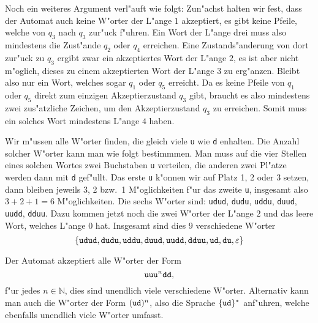 \begin{loesung}
\begin{teilaufgaben}
Noch ein weiteres Argument verl"auft wie folgt:
Zun"achst halten wir fest, dass der Automat auch keine W"orter der
L"ange $1$ akzeptiert, es gibt keine Pfeile, welche von $q_3$ nach
$q_3$ zur"uck f"uhren. Ein Wort der L"ange drei muss also mindestens
die Zust"ande $q_2$ oder $q_4$ erreichen. Eine Zustands"anderung von
dort zur"uck zu $q_3$ ergibt zwar ein akzeptiertes Wort der L"ange
$2$, es ist aber nicht m"oglich, dieses zu einem akzeptierten Wort
der L"ange $3$ zu erg"anzen.
Bleibt also nur ein Wort, welches
sogar $q_1$ oder $q_5$ erreicht. Da es keine Pfeile von $q_1$
oder $q_5$ direkt zum einzigen Akzeptierzustand $q_3$ gibt,
braucht es also mindestens zwei zus"atzliche Zeichen, um den
Akzeptierzustand $q_3$ zu erreichen. Somit muss ein solches
Wort mindestens L"ange $4$ haben.
\item Wir m"ussen alle W"orter finden, die gleich viele {\tt u} wie {\tt d}
enhalten. Die Anzahl solcher W"orter kann man wie folgt bestimmmen.
Man muss auf die vier Stellen eines solchen Wortes zwei Buchstaben
{\tt u} verteilen, die anderen zwei Pl"atze werden dann mit {\tt d}
gef"ullt. Das erste {\tt u} k"onnen wir auf Platz 1, 2 oder 3 setzen,
dann bleiben jeweils 3, 2 bzw.~1 M"oglichkeiten f"ur das zweite {\tt u},
insgesamt also $3+2+1=6$ M"oglichkeiten. Die sechs W"orter sind:
{\tt udud}, {\tt dudu}, {\tt uddu}, {\tt duud}, {\tt uudd}, {\tt dduu}.
Dazu kommen jetzt noch die zwei W"orter der L"ange $2$ und das leere Wort,
welches L"ange $0$ hat. Insgesamt sind dies $9$ verschiedene W"orter
\[
\{
{\tt udud}, {\tt dudu}, {\tt uddu}, {\tt duud}, {\tt uudd}, {\tt dduu},
{\tt ud},{\tt du}, \varepsilon
\}
\]
\item Der Automat akzeptiert alle W"orter der Form
\[
\text{\tt uu}
\text{\tt u}^n
\text{\tt dd},
\]
f"ur jedes $n\in \mathbb N$,
dies sind unendlich viele verschiedene W"orter. Alternativ kann
man auch die W"orter der Form $({\tt ud})^n$, also die Sprache
$\{{\tt ud}\}^*$ anf"uhren, welche ebenfalls unendlich viele W"orter
umfasst.
\end{teilaufgaben}
\end{loesung}

